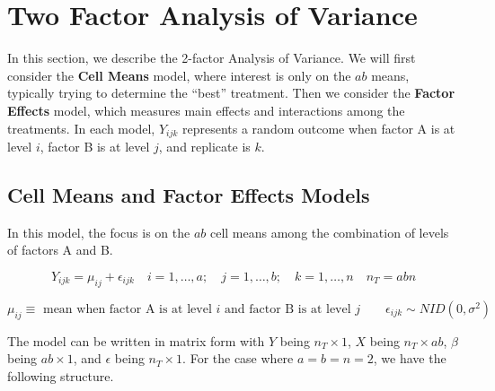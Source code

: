 \documentclass[
]{book}
\begin{document}
\section{Two Factor Analysis of
Variance}\label{two-factor-analysis-of-variance}

In this section, we describe the 2-factor Analysis of Variance. We will
first consider the \textbf{Cell Means} model, where interest is only on
the \(ab\) means, typically trying to determine the ``best'' treatment.
Then we consider the \textbf{Factor Effects} model, which measures main
effects and interactions among the treatments. In each model,
\(Y_{ijk}\) represents a random outcome when factor A is at level \(i\),
factor B is at level \(j\), and replicate is \(k\).

\subsection{Cell Means and Factor Effects
Models}\label{cell-means-and-factor-effects-models}

In this model, the focus is on the \(ab\) cell means among the
combination of levels of factors A and B.

\[
Y_{ijk}=\mu_{ij}+\epsilon_{ijk} \quad i=1,\ldots,a; \quad j=1,\ldots,b;
\quad k=1,\ldots,n \quad n_T=abn
\]

\[
\mu_{ij} \equiv \mbox{ mean when factor A is at level } i \mbox{ and factor B is at level } j   \qquad
\epsilon_{ijk}\sim NID\left(0,\sigma^2\right)
\]

The model can be written in matrix form with \(Y\) being
\(n_T\times 1\), \(X\) being \(n_T \times ab\), \(\beta\) being
\(ab \times 1\), and \(\epsilon\) being \(n_T\times 1\). For the case
where \(a=b=n=2\), we have the following structure.
\end{document}
